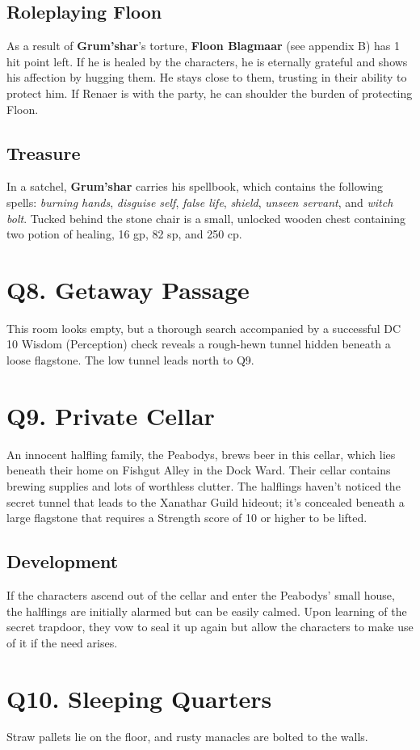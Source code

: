 \documentclass[10pt,a4paper,twoside,twocolumn,openany,nodeprecatedcode]{dndbook}
\begin{document}
\subsection{Roleplaying Floon}
As a result of \textbf{Grum'shar}'s torture, \textbf{Floon Blagmaar} (see appendix B) has 1 hit point left. If he is healed by the characters, he is eternally grateful and shows his affection by hugging them. He stays close to them, trusting in their ability to protect him. If Renaer is with the party, he can shoulder the burden of protecting Floon.
\subsection{Treasure}
In a satchel, \textbf{Grum'shar} carries his spellbook, which contains the following spells: \textit{burning hands}, \textit{disguise self}, \textit{false life}, \textit{shield}, \textit{unseen servant}, and \textit{witch bolt}.
Tucked behind the stone chair is a small, unlocked wooden chest containing two potion of healing, 16 gp, 82 sp, and 250 cp.
\section{Q8. Getaway Passage}
This room looks empty, but a thorough search accompanied by a successful DC 10 Wisdom (Perception) check reveals a rough-hewn tunnel hidden beneath a loose flagstone. The low tunnel leads north to Q9.
\section{Q9. Private Cellar}
An innocent halfling family, the Peabodys, brews beer in this cellar, which lies beneath their home on Fishgut Alley in the Dock Ward. Their cellar contains brewing supplies and lots of worthless clutter.
The halflings haven't noticed the secret tunnel that leads to the Xanathar Guild hideout; it's concealed beneath a large flagstone that requires a Strength score of 10 or higher to be lifted.
\subsection{Development}
If the characters ascend out of the cellar and enter the Peabodys' small house, the halflings are initially alarmed but can be easily calmed. Upon learning of the secret trapdoor, they vow to seal it up again but allow the characters to make use of it if the need arises.
\section{Q10. Sleeping Quarters}
Straw pallets lie on the floor, and rusty manacles are bolted to the walls.
\end{document}
